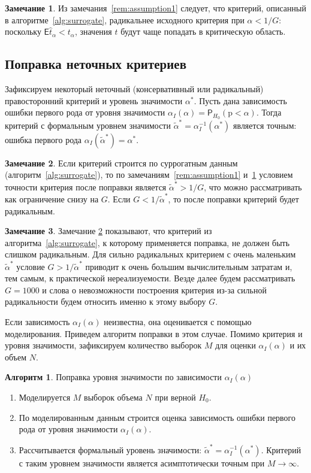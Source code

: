\documentclass[specialist,
substylefile = spbu.rtx,
               subf,href,colorlinks=true, 12pt]{disser}
\theoremstyle{definition}
\newtheorem{algorithm}{Алгоритм}
\newtheorem{remark}{Замечание}
\begin{document}
\begin{remark}\label{remark:liberal0}
	Из замечания~\ref{rem:assumption1} следует, что критерий, описанный в алгоритме~\ref{alg:surrogate}, радикальнее исходного критерия при $\alpha < 1/G$: поскольку $\mathsf E\hat t_\alpha < t_\alpha$, значения $t$ будут чаще попадать в критическую область.
\end{remark}

\subsection{Поправка неточных критериев}\label{sect:correction}
Зафиксируем некоторый неточный (консервативный или радикальный) правосторонний критерий и уровень значимости $\alpha^*$. Пусть дана зависимость ошибки первого рода от уровня значимости $\alpha_I(\alpha)=\mathsf P_{H_0}(\mathrm p < \alpha)$. Тогда критерий с формальным уровнем значимости $\widetilde\alpha^*=\alpha_I^{-1}(\alpha^*)$ является точным: ошибка первого рода $\alpha_I(\widetilde\alpha^*)=\alpha^*$.
\begin{remark}\label{remark:liberal1}
	Если критерий строится по суррогатным данным (алгоритм~\ref{alg:surrogate}), то по замечаниям~\ref{rem:assumption1} и~\ref{remark:liberal0} условием точности критерия после поправки является $\widetilde\alpha^* > 1/G$, что можно рассматривать как ограничение снизу на $G$. Если $G < 1/\widetilde\alpha^*$, то после поправки критерий будет радикальным.
\end{remark}
\begin{remark}\label{remark:liberal}
Замечание \ref{remark:liberal1} показывают, что критерий из алгоритма~\ref{alg:surrogate}, к которому применяется поправка, не должен быть слишком радикальным. Для сильно радикальных критерием с очень маленьким $\widetilde\alpha^*$ условие $G > 1/\widetilde\alpha^*$ приводит к очень большим вычислительным затратам и, тем самым, к практической нереализуемости. Везде далее будем рассматривать $G=1000$ и слова о невозможности построения критерия из-за сильной радикальности будем относить именно к этому выбору $G$.
\end{remark}

Если зависимость $\alpha_I(\alpha)$ неизвестна, она оценивается с помощью моделирования. Приведем алгоритм поправки в этом случае. Помимо критерия и уровня значимости, зафиксируем количество выборок $M$ для оценки $\alpha_I(\alpha)$ и их объем $N$.\newpage
\begin{algorithm}{Поправка уровня значимости по зависимости $\alpha_I(\alpha)$}~\cite{Larin2022}\label{alg:correction}
	\begin{enumerate}
		\item Моделируется $M$ выборок объема $N$ при верной $H_0$.
		\item По моделированным данным строится оценка зависимость ошибки первого рода от уровня значимости $\alpha_I(\alpha)$.
		\item Рассчитывается формальный уровень значимости: $\widetilde{\alpha}^*=\alpha_I^{-1}(\alpha^*)$. Критерий с таким уровнем значимости является асимптотически точным при $M\to\infty$.
	\end{enumerate}
\end{algorithm}
\end{document}
